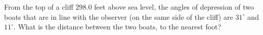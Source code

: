 From the top of a cliff $298.0$ feet above sea level, the angles of depression of two boats that are in line with the observer (on the same side of the cliff) are $31^\circ$ and $11^\circ$. What is the distance between the two boats, to the nearest foot?
